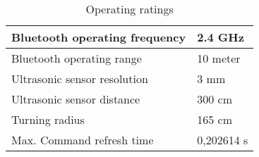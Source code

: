 \documentclass[final]{scrreprt} %
\begin{document}
\begin{table}[H]
\begin{center}
\begin{tabular}{ | l | l |}
    \hline
    Bluetooth operating frequency & 2.4 GHz \\ \hline
    Bluetooth operating range & 10 meter \\\hline
    Ultrasonic sensor resolution    & 3 mm \\\hline
    Ultrasonic sensor distance	         & 300 cm \\\hline
    Turning radius & 165 cm \\\hline
    Max. Command refresh time & 0,202614 s\\\hline
\end{tabular}
\caption{Operating ratings}
\end{center}
\end{table}
\label{table:parameters}
\end{document}

